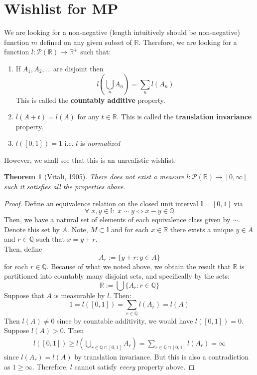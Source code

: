 \documentclass[a4paper, 11pt]{book}
\newtheorem{theorem}{Theorem}
\theoremstyle{definition}
\theoremstyle{remark}
\begin{document}
   \section{Wishlist for MP}
   We are looking for a non-negative (length intuitively should be non-negative) function $m$ defined on any given subset of 
   $\mathbb{R}$. Therefore, we are looking for a function $l: \mathcal{P}(\mathbb{R}) \to \mathbb{R}^{+}$ such that:
   \begin{enumerate}
       \item If $A_1,A_2,\hdots$ are disjoint then
           \[ l(\bigcup_{n} A_n) = \sum_n l(A_n) \]
           This is called the \textbf{countably additive} property.
       \item $l(A+t) = l(A)$ for any $t\in\mathbb{R}$. This is called the \textbf{translation invariance} property.
       \item $l([0,1]) = 1$ i.e. $l$ is \textit{normalized} 
   \end{enumerate}

   However, we shall see that this is an unrealistic wishlist.

   \begin{theorem}[Vitali, 1905]
       There does not exist a measure $l: \mathcal{P}(\mathbb{R}) \to [0,\infty]$ such it satisfies all the properties above.
   \end{theorem}
   \begin{proof}
       Define an equivalence relation on the closed unit interval $\mathbb{I} = [0,1]$ via
       \[ \forall\;x,y\in\mathbb{I}:\;x\sim y \Leftrightarrow x-y\in\mathbb{Q} \]
       Then, we have a natural set of elements of each equivalence class given by $\sim$. Denote this set by $A$. Note,
       $M\subset\mathbb{I}$ and for each $x\in\mathbb{R}$ there exists a unique $y\in A$ and $r\in\mathbb{Q}$ such that
       $x = y + r$.\\
       Then, define
       \[ A_r := \{y+r: y\in A\} \]
       for each $r\in\mathbb{Q}$. Because of what we noted above, we obtain the result that $\mathbb{R}$ is partitioned
       into countably many disjoint sets, and specifically by the sets:
       \[ \mathbb{R} := \bigcup \{A_r: r\in\mathbb{Q}\} \]
       Suppose that $A$ is measurable by $l$. Then:
       \[ 1 = l([0,1]) = \sum_{r\in\mathbb{Q}} l(A_r) = l(A) \]
       Then $l(A)\neq 0$ since by countable additivity, we would have $l([0,1]) = 0$. Suppose $l(A)>0$. Then
       \begin{align*}
           l([0,1]) \geq l(\bigcup_{r\in\mathbb{Q}\cap[0,1]} A_r) = \sum_{r\in\mathbb{Q}\cap[0,1]} l(A_r) = \infty
       \end{align*}
       since $l(A_r) = l(A)$ by translation invariance. But this is also a contradiction as $1 \geq \infty$. Therefore,
       $l$ cannot satisfy \textit{every} property above.
   \end{proof}
\end{document}
